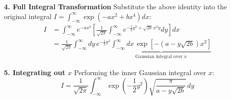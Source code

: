 \documentclass[14pt, a4paper]{extarticle}
\begin{document}
\textbf{4. Full Integral Transformation}
Substitute the above identity into the original integral $I = \int_{-\infty}^{\infty} \exp(-ax^2 + bx^4) dx$:
\begin{equation}
\begin{aligned}
    I &= \int_{-\infty}^{\infty} e^{-ax^2} \left[ \frac{1}{\sqrt{2\pi}} \int_{-\infty}^{\infty} e^{-\frac{1}{2}y^2 + \sqrt{2b}\,x^2 y} dy \right] dx \\
      &= \frac{1}{\sqrt{2\pi}} \int_{-\infty}^{\infty} dy \, e^{-\frac{1}{2}y^2} \underbrace{\int_{-\infty}^{\infty} dx \, \exp\left[ -\left(a - y\sqrt{2b}\right)x^2 \right]}_{\text{Gaussian integral over } x}
\end{aligned}
\end{equation}

\textbf{5. Integrating out $x$}
Performing the inner Gaussian integral over $x$:
\begin{equation}
    I = \frac{1}{\sqrt{2\pi}} \int_{-\infty}^{\infty} \exp\left(-\frac{1}{2}y^2\right) \sqrt{\frac{\pi}{a - y\sqrt{2b}}} \, dy
\end{equation}
\end{document}
